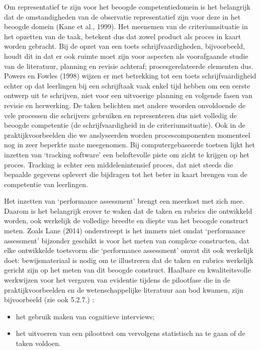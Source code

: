 \documentclass[
  letterpaper,
]{report}
\providecommand{\tightlist}{%
  \setlength{\itemsep}{0pt}\setlength{\parskip}{0pt}}
\begin{document}
Om representatief te zijn voor het beoogde competentiedomein is het
belangrijk dat de omstandigheden van de observatie representatief zijn
voor deze in het beoogde domein (Kane et al., 1999). Het meenemen van de
criteriumsituatie in het opzetten van de taak, betekent dus dat zowel
product als proces in kaart worden gebracht. Bij de opzet van een toets
schrijfvaardigheden, bijvoorbeeld, houdt dit in dat er ook ruimte moet
zijn voor aspecten als voorafgaande studie van de literatuur, planning
en revisie achteraf; procesgerelateerde elementen dus. Powers en Fowles
(1998) wijzen er met betrekking tot een toets schrijfvaardigheid echter
op dat leerlingen bij een schrijftaak vaak enkel tijd hebben om een
eerste ontwerp uit te schrijven, niet voor een uitvoerige planning en
volgende fasen van revisie en herwerking. De taken belichten met andere
woorden onvoldoende de vele processen die schrijvers gebruiken en
representeren dus niet volledig de beoogde competentie (de
schrijfvaardigheid in de criteriumsituatie). Ook in de
praktijkvoorbeelden die we anslyseerden worden procescomponenten
momenteel nog in zeer beperkte mate meegenomen. Bij computergebaseerde
toetsen lijkt het inzetten van `tracking software' een beloftevolle
piste om zicht te krijgen op het proces. Tracking is echter een
middelenintensief proces, dat niet steeds die bepaalde gegevens oplevert
die bijdragen tot het beter in kaart brengen van de competentie van
leerlingen.

Het inzetten van `performance assessment' brengt een meerkost met zich
mee. Daarom is het belangrijk erover te waken dat de taken en rubrics
die ontwikkeld worden, ook werkelijk de volledige breedte en diepte van
het beoogde construct meten. Zoals Lane (2014) onderstreept is het
immers niet omdat `performance assessment' bijzonder geschikt is voor
het meten van complexe constructen, dat elke ontwikkelde toetsvorm die
`performance assessment' omvat dit ook werkelijk doet: bewijsmateriaal
is nodig om te illustreren dat de taken en rubrics werkelijk gericht
zijn op het meten van dit beoogde construct. Haalbare en kwaliteitsvolle
werkwijzen voor het vergaren van evidentie tijdens de pilootfase die in
de praktijkvoorbeelden en de wetenschappelijke literatuur aan bod
kwamen, zijn bijvoorbeeld (zie ook 5.2.7.) :

\begin{itemize}
\tightlist
\item
  het gebruik maken van cognitieve interviews;
\item
  het uitvoeren van een piloottest om vervolgens statistisch na te gaan
  of de taken voldoen.
\end{itemize}
\end{document}
